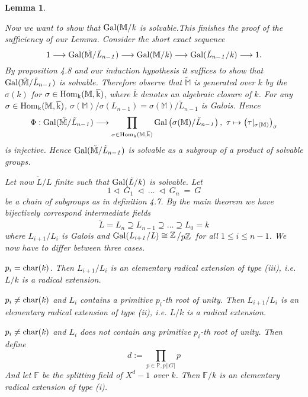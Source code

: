 \documentclass[11pt]{book}
\newtheorem{lemma}[theorem]{Lemma}
\theoremstyle{nonumberbreak}
\newenvironment{pr}[1][]{\ifthenelse{\equal{#1}{}}{\proof}{\proof[#1]}\rm}{\endproof}
\newcommand{\slant}[2]{{\raisebox{.1em}{$#1$}\left/\raisebox{-.1em}{$#2$}\right.}}
\begin{document}
\begin{spacing}{1.3}
\begin{lemma}
\begin{pr}
\begin{compactitem}
\begin{compactitem}
Now we want to show that $\rm{Gal}\it(\mathbb{M}/k$ is solvable.This finishes the proof of the sufficiency of our Lemma. Consider the short exact sequence $$1 \longrightarrow \rm{Gal}\it(\tilde{\mathbb{M}}/\tilde{L}_{n-1}) \longrightarrow \rm{Gal}\it(\mathbb{M}/k) \longrightarrow \rm{Gal}\it(\tilde{L}_{n-1}/k) \longrightarrow \rm1.$$ By proposition 4.8 and our induction hypothesis it suffices to show that $\rm{Gal}\it(\tilde{\mathbb{M}}/\tilde{L}_{n-1})$ is solvable. Therefore observe that $\tilde{\mathbb{M}}$ is generated over $k$ by the $\sigma(k)$ for $\sigma \in \rm{Hom}_{k}(\mathbb{M}, \overline{k})$, where $\overline{k}$ denotes an algebraic closure of $k$. For any $\sigma \in \rm{Hom}_{k}(\mathbb{M},\overline{k})$, $\sigma(\mathbb{M})/\sigma(L_{n-1})=\sigma(\mathbb{M})/\tilde{L}_{n-1}$ is Galois. Hence
$$\Phi: \rm{Gal}\it(\tilde{\mathbb{M}}/\tilde{L}_{n-1}) \longrightarrow \prod_{\sigma \in \rm{Hom}_{k}(\mathbb{M}, \overline{k})} \rm{Gal}\it\left(\sigma(\mathbb{M})/\tilde{L}_{n-1}\right), \textrm{ } \tau \mapsto \left(\tau |_{\sigma(\mathbb{M})}\right)_{\sigma}$$
is injective.
Hence $\rm{Gal}\it(\tilde{\mathbb{M}}/\tilde{L}_{n-1})$ is solvable as a subgroup of a product of solvable groups.
\end{compactitem}
\item['$\Leftarrow$'] Let now $\tilde{L}/L$ finite such that $\rm{Gal}\it(\tilde{L}/k)$ is solvable. Let 
$$1 \triangleleft \ G_1\ \triangleleft\ \dots \ \triangleleft\ G_n \ =\ G$$ be a chain of subgroups as in definition 4.7. By the main theorem we have bijectively correspond intermediate fields
$$ \tilde{L}=L_n \supseteq L_{n-1} \supseteq \dots \supseteq L_0 = k$$
where $L_{i+1}/L_i$ is Galois and $\gal(L_{i+1}/L) \cong \slant{\mathbb{Z}}{p \mathbb{Z}}$ for all $1 \leqslant i \leqslant n-1$. We now have to differ between three cases.
\begin{compactitem}
\item[\textbf{case 1}] $p_i=\rm{char}\it(k)$. Then $L_{i+1}/L_i$ is an elementary radical extension of type (iii), i.e. $L/k$ is a radical extension.
\item[\textbf{case 2}] $p_i \neq \rm{char}\it(k)$ \textit{and} $L_{i}$ contains a primitive $p_i$-th root of unity. Then $L_{i+1}/L_i$ is an elementary radical extension of type (ii), i.e. $L/k$ is a radical extension.
\item[\textbf{case 3}] $p_i \neq \rm{char}\it(k)$ \textit{and} $L_{i}$ does not contain any primitive $p_i$-th root of unity. Then define
$$d:=\prod_{p \in \mathbb{P}, p \mid \vert G \vert} p$$
And let $\mathbb{F}$ be the splitting field of $X^d-1$ over $k$.  Then $\mathbb{F}/k$ is an elementary radical extension of type (i).

\end{compactitem}
\end{compactitem}
\end{pr}
\end{lemma}
\end{spacing}
\end{document}
